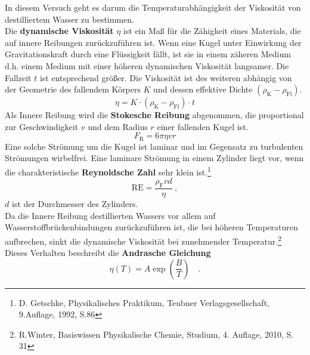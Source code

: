 In diesem Versuch geht es darum die Temperaturabhängigkeit der Viskosität von destilliertem Wasser zu bestimmen. \\
Die \textbf{dynamische Viskosität} $\eta$ ist ein Maß für die Zähigkeit eines Materials, die auf innere Reibungen zurückzuführen ist. Wenn eine Kugel unter Einwirkung der Gravitationskraft durch eine Flüssigkeit fällt, ist sie in einem zäheren Medium d.h. einem Medium mit einer höheren dynamischen Viskosität langsamer. Die Fallzeit $t$ ist entsprechend größer. Die Viskosität ist des weiteren abhängig von der Geometrie des fallendem Körpers $K$ und dessen effektive Dichte $ (\rho_\text{K}-\rho_\text{Fl}) $.
\begin{equation}
\label{Visk}
\eta = K \cdot (\rho_\text{K} - \rho_\text{Fl}) \cdot  t
\end{equation}
Als Innere Reibung wird die \textbf{Stokesche Reibung} abgenommen, die proportional zur Geschwindigkeit $v$ und dem Radius $r$ einer fallenden Kugel ist.
\begin{equation}
F_\text{R} = 6\pi \eta v r
\end{equation}
Eine solche Strömung um die Kugel ist laminar und im Gegensatz zu turbulenten Strömungen wirbelfrei. Eine laminare Strömung in einem Zylinder liegt vor, wenn die charakteristische \textbf{Reynoldsche Zahl} sehr klein ist.\footnote{D. Getschke, Physikalisches Praktikum, Teubner Verlagsgesellschaft, 9.Auflage, 1992, S.86}
\begin{equation}
\label{Reynolds}
\text{RE} = \frac{\rho_\text{F} v d}{\eta} \ ,
\end{equation}
$d$ ist der Durchmesser des Zylinders. \\
Da die Innere Reibung destillierten Wassers vor allem auf Wasserstoffbrückenbindungen zurückzuführen ist, die bei höheren Temperaturen aufbrechen, sinkt die dynamische Viskosität bei zunehmender Temperatur.\footnote{R.Winter, Basiswissen Physikalische Chemie, Studium, 4. Auflage, 2010, S. 31} Dieses Verhalten beschreibt die \textbf{Andrasche Gleichung}
\begin{equation}
\label{Andra}
\eta(T) = A \exp \left(\frac{B}{T}\right) \quad.
\end{equation}